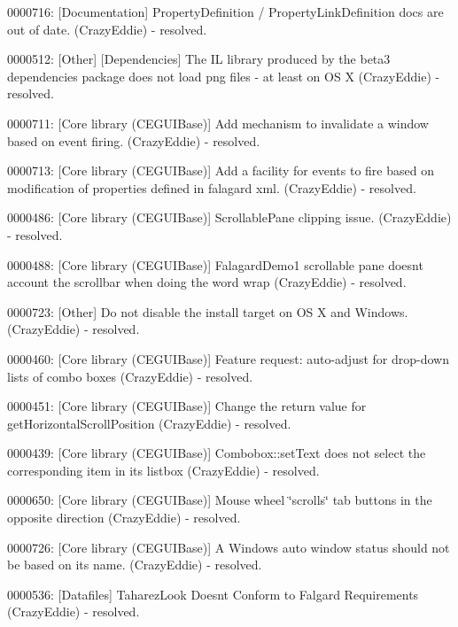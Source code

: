 \begin{DoxyItemize}
\item 0000716\+: \mbox{[}Documentation\mbox{]} Property\+Definition / Property\+Link\+Definition docs are out of date. (Crazy\+Eddie) -\/ resolved.
\item 0000512\+: \mbox{[}Other\mbox{]} \mbox{[}Dependencies\mbox{]} The IL library produced by the beta3 dependencies package does not load png files -\/ at least on OS X (Crazy\+Eddie) -\/ resolved.
\item 0000711\+: \mbox{[}Core library (C\+E\+G\+U\+I\+Base)\mbox{]} Add mechanism to invalidate a window based on event firing. (Crazy\+Eddie) -\/ resolved.
\item 0000713\+: \mbox{[}Core library (C\+E\+G\+U\+I\+Base)\mbox{]} Add a facility for events to fire based on modification of properties defined in falagard xml. (Crazy\+Eddie) -\/ resolved.
\item 0000486\+: \mbox{[}Core library (C\+E\+G\+U\+I\+Base)\mbox{]} Scrollable\+Pane clipping issue. (Crazy\+Eddie) -\/ resolved.
\item 0000488\+: \mbox{[}Core library (C\+E\+G\+U\+I\+Base)\mbox{]} Falagard\+Demo1 scrollable pane doesn\textquotesingle{}t account the scrollbar when doing the word wrap (Crazy\+Eddie) -\/ resolved.
\item 0000723\+: \mbox{[}Other\mbox{]} Do not disable the install target on OS X and Windows. (Crazy\+Eddie) -\/ resolved.
\item 0000460\+: \mbox{[}Core library (C\+E\+G\+U\+I\+Base)\mbox{]} Feature request\+: auto-\/adjust for drop-\/down lists of combo boxes (Crazy\+Eddie) -\/ resolved.
\item 0000451\+: \mbox{[}Core library (C\+E\+G\+U\+I\+Base)\mbox{]} Change the return value for get\+Horizontal\+Scroll\+Position (Crazy\+Eddie) -\/ resolved.
\item 0000439\+: \mbox{[}Core library (C\+E\+G\+U\+I\+Base)\mbox{]} Combobox\+::set\+Text does not select the corresponding item in its listbox (Crazy\+Eddie) -\/ resolved.
\item 0000650\+: \mbox{[}Core library (C\+E\+G\+U\+I\+Base)\mbox{]} Mouse wheel \char`\"{}scrolls\char`\"{} tab buttons in the opposite direction (Crazy\+Eddie) -\/ resolved.
\item 0000726\+: \mbox{[}Core library (C\+E\+G\+U\+I\+Base)\mbox{]} A Window\textquotesingle{}s \textquotesingle{}auto window\textquotesingle{} status should not be based on it\textquotesingle{}s name. (Crazy\+Eddie) -\/ resolved.
\item 0000536\+: \mbox{[}Datafiles\mbox{]} Taharez\+Look Doesn\textquotesingle{}t Conform to Falgard Requirements (Crazy\+Eddie) -\/ resolved.

\end{DoxyItemize}
